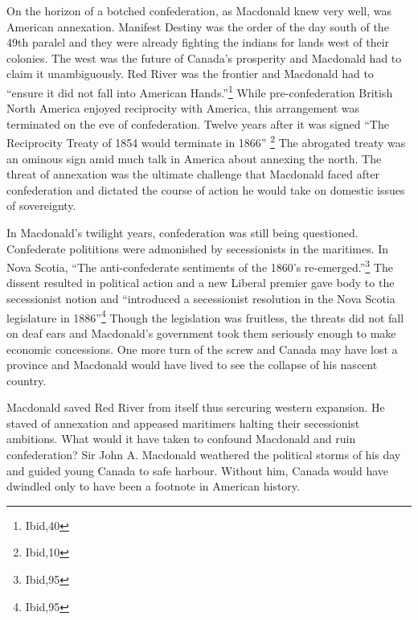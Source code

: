 \documentclass[12pt]{article} %
\begin{document}


On the horizon of a botched confederation, as Macdonald knew very well, was American annexation. 
Manifest Destiny was the order of the day south of the 49th paralel and they were already fighting the indians for lands west of their colonies.
The west was the future of Canada's prosperity and Macdonald had to claim it unambiguously. 
Red River was the frontier and Macdonald had to ``ensure it did not fall into American Hands.''\footnote{Ibid,40}
While pre-confederation British North America enjoyed reciprocity with America, this arrangement was terminated on the eve of confederation.
Twelve years after it was signed ``The Reciprocity Treaty of 1854 would terminate in 1866'' \footnote{Ibid,10}
The abrogated treaty was an ominous sign amid much talk in America about annexing the north. 
The threat of annexation was the ultimate challenge that Macdonald faced after confederation and dictated the course of action he would take on domestic issues of sovereignty.

In Macdonald's twilight years, confederation was still being questioned.  
Confederate polititions were admonished by secessionists in the maritimes.
In Nova Scotia, ``The anti-confederate sentiments of the 1860's re-emerged.''\footnote{Ibid,95}
The dissent resulted in political action and a new Liberal premier gave body to the secessionist notion and ``introduced a secessionist resolution in the Nova Scotia legislature in 1886''\footnote{Ibid,95}
Though the legislation was fruitless, the threats did not fall on deaf ears and Macdonald's government took them seriously enough to make economic concessions. 
One more turn of the screw and Canada may have lost a province and Macdonald would have lived to see the collapse of his nascent country.



Macdonald saved Red River from itself thus sercuring western expansion. 
He staved of annexation and appeased maritimers halting their secessionist ambitions.
What would it have taken to confound Macdonald and ruin confederation? 
Sir John A. Macdonald weathered the political storms of his day and guided young Canada to safe harbour. 
Without him, Canada would have dwindled only to have been a footnote in American history.




\newpage




 


\end{document}
